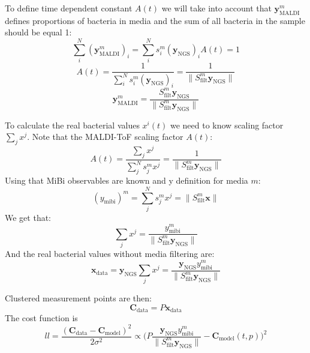 \documentclass[10pt,A4paper]{article}
\begin{document}
To define time dependent constant $A(t)$ we will take into account that $\mathbf{y}^m_\text{MALDI}$ defines proportions of bacteria in media and the sum of all bacteria in the sample should be equal 1:
\begin{equation}
    \sum_i^N (\mathbf{y}^m_\text{MALDI})_i = \sum_i^N s_i^m (\mathbf{y}_\text{NGS})_i A(t) = 1
 \end{equation}
 \begin{equation}
    A(t) = \frac{1}{\sum_i^N s_i^m (\mathbf{y}_\text{NGS})_i} = \frac{1}{\lVert S^m_\text{filt} \mathbf{y}_\text{NGS} \rVert}
 \end{equation}
 \begin{equation}
    \boxed{\mathbf{y}^m_\text{MALDI} = \frac{S^m_\text{filt} \mathbf{y}_\text{NGS}}{\lVert S^m_\text{filt} \mathbf{y}_\text{NGS} \rVert}}
    \label{eq:obs_maldi}
\end{equation}

To calculate the real bacterial values $x^i(t)$ we need to know scaling factor $\sum_j x^j$.
Note that the MALDI-ToF scaling factor $A(t)$:
\begin{equation}
    A(t) = \frac{\sum_j x^j}{\sum_j^N s^m_j x^j} = \frac{1}{\lVert S^m_\text{filt} \mathbf{y}_\text{NGS} \rVert}
\end{equation}
Using that MiBi observables are known and y definition for media $m$:
\begin{equation}
    (y_\text{mibi})^m = \sum_j^N s^m_j x^j = \lVert S^m_\text{filt} \mathbf{x} \rVert
\end{equation}
We get that:
\begin{equation}
    \sum_j x^j = \frac{y_\text{mibi}^m}{\lVert S^m_\text{filt} \mathbf{y}_\text{NGS} \rVert}
\end{equation}
And the real bacterial values without media filtering are:
\begin{equation}
    \boxed{\mathbf{x}_\text{data} = \mathbf{y}_\text{NGS} \sum_j x^j = \frac{\mathbf{y}_\text{NGS} y_\text{mibi}^m}{\lVert S^m_\text{filt} \mathbf{y}_\text{NGS} \rVert}}
    \label{eq:X_real}
\end{equation}

Clustered measurement points are then:
\begin{equation}
    \mathbf{C}_\text{data} = P \mathbf{x}_\text{data}
\end{equation} 
The cost function is 
\begin{equation}
    ll = \frac{(\mathbf{C}_\text{data} - \mathbf{C}_\text{model})^2}{2 \sigma^2} \propto \bigg (P \frac{\mathbf{y}_\text{NGS} y_\text{mibi}^m}{\lVert S^m_\text{filt} \mathbf{y}_\text{NGS} \rVert} - \mathbf{C}_\text{model} (t, p) \bigg )^2
\end{equation}
\end{document}

